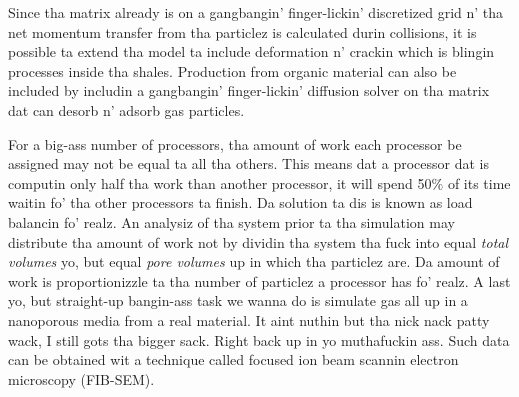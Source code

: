 Since tha matrix already is on a gangbangin' finger-lickin' discretized grid n' tha net momentum transfer from tha particlez is calculated durin collisions, it is possible ta extend tha model ta include deformation n' crackin which is blingin processes inside tha shales. Production from organic material can also be included by includin a gangbangin' finger-lickin' diffusion solver on tha matrix dat can desorb n' adsorb gas particles.

For a big-ass number of processors, tha amount of work each processor be assigned may not be equal ta all tha others. This means dat a processor dat is computin only half tha work than another processor, it will spend 50$\%$ of its time waitin fo' tha other processors ta finish. Da solution ta dis is known as load balancin fo' realz. An analysiz of tha system prior ta tha simulation may distribute tha amount of work not by dividin tha system tha fuck into equal \textit{total volumes} yo, but equal \textit{pore volumes} up in which tha particlez are. Da amount of work is proportionizzle ta tha number of particlez a processor has fo' realz. A last yo, but straight-up bangin-ass task we wanna do is simulate gas all up in a nanoporous media from a real material. It aint nuthin but tha nick nack patty wack, I still gots tha bigger sack. Right back up in yo muthafuckin ass. Such data can be obtained wit a technique called focused ion beam scannin electron microscopy (FIB-SEM). 